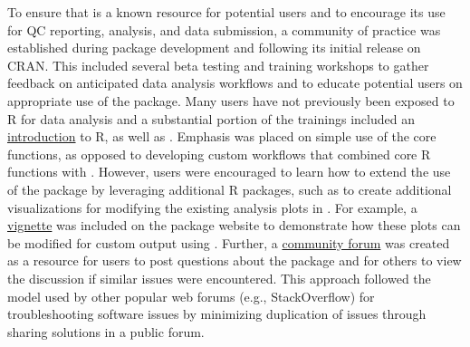 To ensure that  is a known resource for potential users and to encourage its use for QC reporting, analysis, and data submission, a community of practice was established during package development and following its initial release on CRAN. This included several beta testing and training workshops to gather feedback on anticipated data analysis workflows and to educate potential users on appropriate use of the package. Many users have not previously been exposed to R for data analysis and a substantial portion of the trainings included an \href{https://massbays-tech.github.io/intro-to-r/}{introduction} to R, as well as . Emphasis was placed on simple use of the core functions, as opposed to developing custom workflows that combined core R functions with . However, users were encouraged to learn how to extend the use of the package by leveraging additional R packages, such as  to create additional visualizations for modifying the existing analysis plots in . For example, a \href{https://massbays-tech.github.io/MassWateR/articles/modifying.html}{vignette} was included on the package website to demonstrate how these plots can be modified for custom output using . Further, a \href{https://massbays.discourse.group/c/masswater-r-tools/5}{community forum} was created as a resource for users to post questions about the package and for others to view the discussion if similar issues were encountered. This approach followed the model used by other popular web forums (e.g., StackOverflow) for troubleshooting software issues by minimizing duplication of issues through sharing solutions in a public forum.

